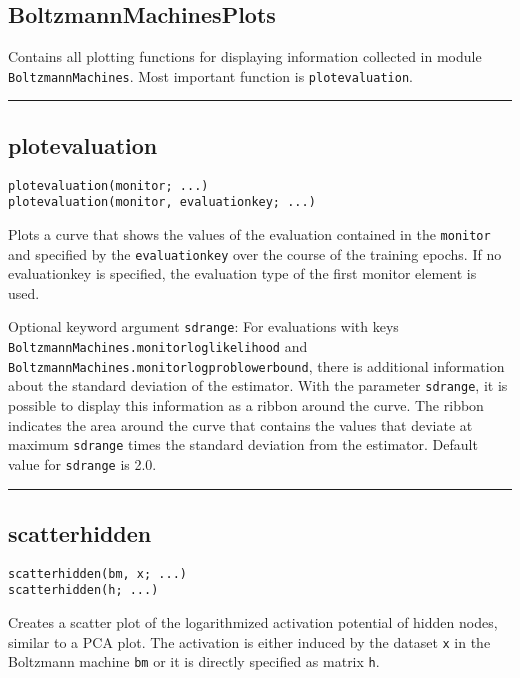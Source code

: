 \subsection*{BoltzmannMachinesPlots}  \label{bmplots_BoltzmannMachinesPlots}
Contains all plotting functions for displaying information collected in module \texttt{BoltzmannMachines}. Most important function is \texttt{plotevaluation}.

\noindent\rule{\textwidth}{1pt}
\subsection*{plotevaluation}  \label{bmplots_plotevaluation}
\begin{verbatim}
plotevaluation(monitor; ...)
plotevaluation(monitor, evaluationkey; ...)
\end{verbatim}
Plots a curve that shows the values of the evaluation contained in the \texttt{monitor} and specified by the \texttt{evaluationkey} over the course of the training epochs. If no evaluationkey is specified, the evaluation type of the first monitor element is used.

Optional keyword argument \texttt{sdrange}: For evaluations with keys \texttt{BoltzmannMachines.monitorloglikelihood} and \texttt{BoltzmannMachines.monitorlogproblowerbound}, there is additional information about the standard deviation of the estimator. With the parameter \texttt{sdrange}, it is possible to display this information as a ribbon around the curve. The ribbon indicates the area around the curve that contains the values that deviate at maximum \texttt{sdrange} times the standard deviation from the estimator. Default value for \texttt{sdrange} is 2.0.

\noindent\rule{\textwidth}{1pt}
\subsection*{scatterhidden}  \label{bmplots_scatterhidden}
\begin{verbatim}
scatterhidden(bm, x; ...)
scatterhidden(h; ...)
\end{verbatim}
Creates a scatter plot of the logarithmized activation potential of hidden nodes, similar to a PCA plot. The activation is either induced by the dataset \texttt{x} in the Boltzmann machine \texttt{bm} or it is directly specified as matrix \texttt{h}.

